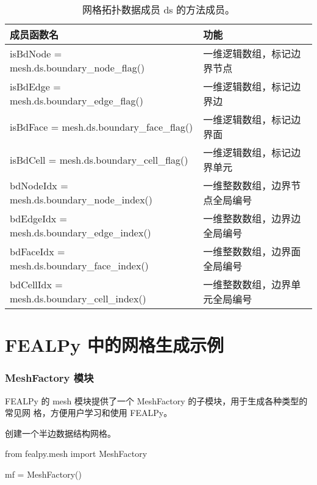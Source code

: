 \documentclass{beamer}
\numberwithin{subsection}{section}
\begin{document}
\begin{frame}
\begin{onlyenv}
\begin{table}[H]
\begin{tabular}{|l|l|}
        成员函数名 & 功能\\\hline
        isBdNode = mesh.ds.boundary\_node\_flag() &	一维逻辑数组，标记边界节点\\\hline
        isBdEdge = mesh.ds.boundary\_edge\_flag() &	一维逻辑数组，标记边界边\\\hline
        isBdFace = mesh.ds.boundary\_face\_flag() &	一维逻辑数组，标记边界面\\\hline
        isBdCell = mesh.ds.boundary\_cell\_flag() &	一维逻辑数组，标记边界单元\\\hline
        bdNodeIdx = mesh.ds.boundary\_node\_index() &一维整数数组，边界节点全局编号 \\\hline
        bdEdgeIdx = mesh.ds.boundary\_edge\_index() &一维整数数组，边界边全局编号 \\\hline
        bdFaceIdx = mesh.ds.boundary\_face\_index() &一维整数数组，边界面全局编号 \\\hline
        bdCellIdx = mesh.ds.boundary\_cell\_index() &一维整数数组，边界单元全局编号 \\\hline
    \end{tabular}
    \caption{网格拓扑数据成员 ds 的方法成员。} \label{tab:ds}
\end{table}
\end{onlyenv}
\end{frame}

\section{FEALPy 中的网格生成示例}
\begin{frame}[fragile]
    \frametitle{ MeshFactory 模块}
    FEALPy 的 mesh 模块提供了一个 MeshFactory 的子模块，用于生成各种类型的常见网
    格，方便用户学习和使用 FEALPy。
	\begin{listing}[H]
	 \footnotesize
     \caption{创建一个半边数据结构网格。}
	 \begin{pythoncode}
from fealpy.mesh import MeshFactory

mf = MeshFactory()
	 \end{pythoncode}     
	\end{listing}
\end{frame}
\end{document}

